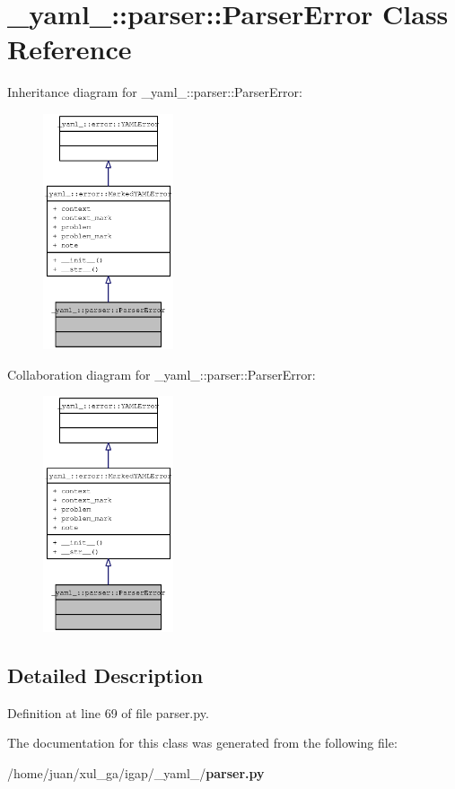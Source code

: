 \section{\_\-yaml\_\-::parser::ParserError Class Reference}
\label{class__yaml___1_1parser_1_1ParserError}
Inheritance diagram for \_\-yaml\_\-::parser::ParserError:\nopagebreak
\begin{figure}[H]
\begin{center}
\leavevmode
\includegraphics[width=109pt]{class__yaml___1_1parser_1_1ParserError__inherit__graph}
\end{center}
\end{figure}
Collaboration diagram for \_\-yaml\_\-::parser::ParserError:\nopagebreak
\begin{figure}[H]
\begin{center}
\leavevmode
\includegraphics[width=109pt]{class__yaml___1_1parser_1_1ParserError__coll__graph}
\end{center}
\end{figure}


\subsection{Detailed Description}


Definition at line 69 of file parser.py.

The documentation for this class was generated from the following file:\begin{CompactItemize}
\item 
/home/juan/xul\_\-ga/igap/\_\-yaml\_\-/{\bf parser.py}\end{CompactItemize}
